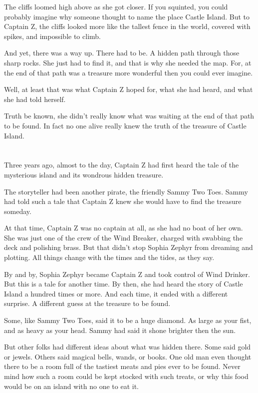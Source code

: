 \documentclass[12pt]{extbook}
\begin{document}
  The cliffs loomed high above as she got closer. If you squinted, you
  could probably imagine why someone thought to name the place Castle
  Island. But to Captain Z, the cliffs looked more like the tallest fence
  in the world, covered with spikes, and impossible to climb.
  
  And yet, there was a way up. There had to be. A hidden path through
  those sharp rocks. She just had to find it, and that is why she needed
  the map. For, at the end of that path was a treasure more wonderful then
  you could ever imagine.
  
  Well, at least that was what Captain Z hoped for, what she had heard,
  and what she had told herself.
  
  Truth be known, she didn't really know what was waiting at the end of
  that path to be found. In fact no one alive really knew the truth of the
  treasure of Castle Island.
  
  \section{}\label{section-13}
  
  Three years ago, almost to the day, Captain Z had first heard the tale
  of the mysterious island and its wondrous hidden treasure.
  
  The storyteller had been another pirate, the friendly Sammy Two Toes.
  Sammy had told such a tale that Captain Z knew she would have to find
  the treasure someday.
  
  At that time, Captain Z was no captain at all, as she had no boat of her
  own. She was just one of the crew of the Wind Breaker, charged with
  swabbing the deck and polishing brass. But that didn't stop Sophia
  Zephyr from dreaming and plotting. All things change with the times and
  the tides, as they say.
  
  By and by, Sophia Zephyr became Captain Z and took control of Wind
  Drinker. But this is a tale for another time. By then, she had heard the
  story of Castle Island a hundred times or more. And each time, it ended
  with a different surprise. A different guess at the treasure to be
  found.
  
  Some, like Sammy Two Toes, said it to be a huge diamond. As large as
  your fist, and as heavy as your head. Sammy had said it shone brighter
  then the sun.
  
  But other folks had different ideas about what was hidden there. Some
  said gold or jewels. Others said magical bells, wands, or books. One old
  man even thought there to be a room full of the tastiest meats and pies
  ever to be found. Never mind how such a room could be kept stocked with
  such treats, or why this food would be on an island with no one to eat
  it.
  
\end{document}
